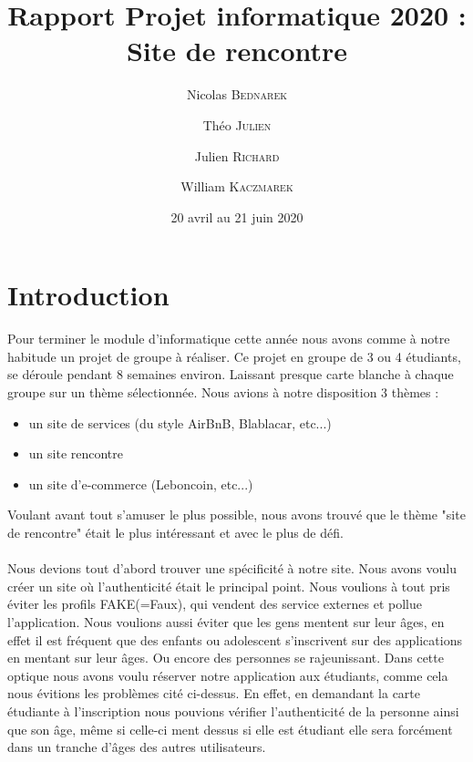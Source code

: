 \documentclass[12pt]{report}
\title{Rapport Projet informatique 2020 :\\Site de rencontre}
\author{Nicolas \textsc{Bednarek} \and Théo \textsc{Julien} \and Julien \textsc{Richard}\and William \textsc{Kaczmarek}}
\date{20  avril au 21 juin 2020}
\begin{document}
	\maketitle
	\tableofcontents
	\clearpage
\section{Introduction} 
	Pour terminer le module d'informatique cette année nous avons comme à notre habitude un projet de groupe à réaliser. Ce projet en groupe de 3 ou 4 étudiants, se déroule pendant 8 semaines environ. Laissant presque carte blanche à chaque groupe sur un thème sélectionnée. Nous avions à notre disposition 3 thèmes : \\
\begin{itemize}
	\item un site de services (du style AirBnB, Blablacar, etc...)
	\item un site rencontre
	\item un site d'e-commerce (Leboncoin, etc...)\\
\end{itemize}
Voulant avant tout s'amuser le plus possible, nous avons trouvé que le thème "site de rencontre" était le plus intéressant et avec le plus de défi.\\
\\
Nous devions tout d'abord trouver une spécificité à notre site. Nous avons voulu créer un site où l'authenticité était le principal point. Nous voulions à tout pris éviter les profils FAKE(=Faux), qui vendent des service externes et pollue l'application. Nous voulions aussi éviter que les gens mentent sur leur âges, en effet il est fréquent que des enfants ou adolescent s'inscrivent sur des applications en mentant sur leur âges. Ou encore des personnes se rajeunissant. Dans cette optique nous avons voulu réserver notre application aux étudiants, comme cela nous évitions les problèmes cité ci-dessus. En effet, en demandant la carte étudiante à l'inscription nous pouvions vérifier l'authenticité de la personne ainsi que son âge, même si celle-ci ment dessus si elle est étudiant elle sera forcément dans un tranche d'âges des autres utilisateurs. \\
\\ 
\end{document}
